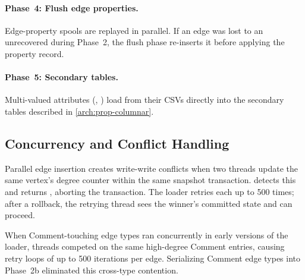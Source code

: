 \paragraph{Phase~4: Flush edge properties.}
Edge-property spools are replayed in parallel.
If an edge was lost to an unrecovered  during Phase~2, the flush phase re-inserts it before applying the property record.

\paragraph{Phase~5: Secondary tables.}
Multi-valued attributes (, ) load from their CSVs directly into the secondary tables described in \autoref{arch:prop-columnar}.

\subsection{Concurrency and Conflict Handling}
\label{arch:prop-bulk:concurrency}

Parallel edge insertion creates write-write conflicts when two threads update the same vertex's degree counter within the same \wt{} snapshot transaction.
\wt{} detects this and returns , aborting the transaction.
The loader retries each  up to 500 times; after a rollback, the retrying thread sees the winner's committed state and can proceed.

When Comment-touching edge types ran concurrently in early versions of the loader, threads competed on the same high-degree Comment entries, causing retry loops of up to 500 iterations per edge.
Serializing Comment edge types into Phase~2b eliminated this cross-type contention.
